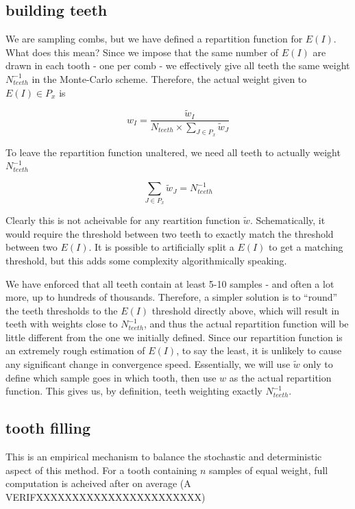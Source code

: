 \documentclass[./thesis.tex]{subfiles}
\begin{document}
\subsection*{building teeth}

We are sampling combs, but we have defined a repartition function for $E(I)$. What does this mean? Since we impose that the same number of $E(I)$ are drawn in each tooth - one per comb - we effectively give all teeth the same weight $N_{teeth}^{-1}$ in the Monte-Carlo scheme. Therefore, the actual weight given to $E(I) \in P_x$ is

$$w_I = \frac{\tilde w_I}{N_{teeth} \times \sum_{J \in P_x} \tilde w_J}$$

To leave the repartition function unaltered, we need all teeth to actually weight $N_{teeth}^{-1}$

$$\sum_{J \in P_x} \tilde w_J = N_{teeth}^{-1}$$

Clearly this is not acheivable for any reartition function $\tilde w$. Schematically, it would require the threshold between two teeth to exactly match the threshold between two $E(I)$. It is possible to artificially split a $E(I)$ to get a matching threshold, but this adds some complexity algorithmically speaking.

We have enforced that all teeth contain at least 5-10 samples - and often a lot more, up to hundreds of thousands. Therefore, a simpler solution is to ``round'' the teeth thresholds to the $E(I)$ threshold directly above, which will result in teeth with weights close to $N_{teeth}^{-1}$, and thus the actual repartition function will be little different from the one we initially defined. Since our repartition function is an extremely rough estimation of $E(I)$, to say the least, it is unlikely to cause any significant change in convergence speed.
Essentially, we will use $\tilde w$ only to define which sample goes in which tooth, then use $w$ as the actual repartition function. This gives us, by definition, teeth weighting exactly $N_{teeth}^{-1}$.

\subsection*{tooth filling}

This is an empirical mechanism to balance the stochastic and deterministic aspect of this method. For a tooth containing $n$ samples of equal weight, full computation is acheived after on average (A VERIFXXXXXXXXXXXXXXXXXXXXXXX)
\end{document}
